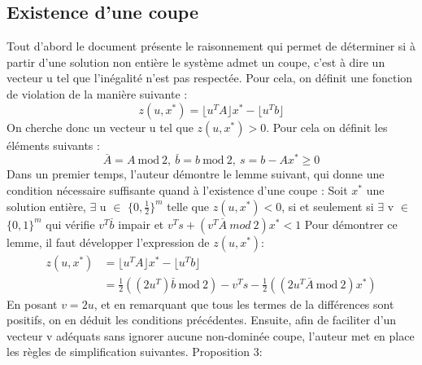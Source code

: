 \documentclass[12pt]{report}
\begin{document}
\subsection{Existence d'une coupe}
Tout d'abord le document présente le raisonnement qui permet de déterminer si à partir d'une solution non entière le système admet un coupe, c'est à dire un vecteur u tel que l'inégalité n'est pas respectée. Pour cela, on définit une fonction de violation de la manière suivante :
$$
z(u,x^\ast)=\lfloor u^TA \rfloor x^\ast-\lfloor u^Tb \rfloor
$$
On cherche donc un vecteur u tel que $z(u,x^\ast)>0$.
Pour cela on définit les éléments suivants :
$$
\overset{\_}{A}=A \ \mbox{mod} \ 2, \ \overset{\_}{b}=b \ \mbox{mod} \ 2,\ s = b-Ax^\ast \ge 0
$$
Dans un premier temps, l'auteur démontre le lemme suivant, qui donne une condition nécessaire suffisante quand à l'existence d'une coupe :
\newline
\newline
Soit $x^\ast$ une solution entière, $\exists$ u $\in$ $\{0,\frac{1}{2}\}^m$ telle que $z(u,x^\ast)<0$, si et seulement si $\exists$ v $\in$ $\{0,1\}^m$ qui vérifie $v^T\overset{\_}{b}$ impair et $v^Ts+(v^T\overset{\_}{A}\ mod\ 2)x^\ast < 1 $
\newline
\newline
Pour démontrer ce lemme, il faut développer l'expression de $z(u,x^\ast)$:
\newline
\begin{equation}
\begin{split}
z(u,x^\ast) & =\lfloor u^TA \rfloor x^\ast-\lfloor u^Tb \rfloor \\
 & = \frac{1}{2}((2u^T)\overset{\_}{b}\ \mbox{mod}\ 2) -v^Ts-\frac{1}{2}((2u^T\overset{\_}{A}\ \mbox{mod} \ 2)x^\ast)
\end{split}
\end{equation}
En posant $v=2u$, et en remarquant que tous les termes de la différences sont positifs, on en déduit les conditions précédentes.
\newline
Ensuite, afin de faciliter d'un vecteur v adéquats sans ignorer aucune non-dominée coupe, l'auteur met en place les règles de simplification suivantes.
\newline
\large{Proposition 3:}
\end{document}
